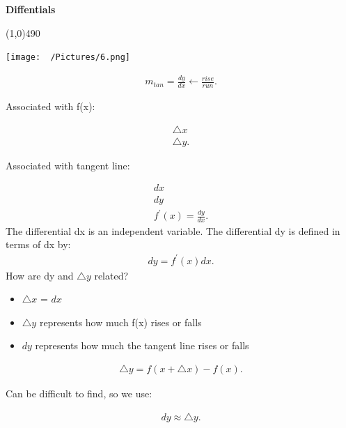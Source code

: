 \documentclass{report}
\begin{document}
    \pagebreak \bigbreak \noindent
    \begin{mdframed}
    \begin{large}
        \begin{center}
            \textbf{Diffentials}
        \end{center}
    \end{large}
    \end{mdframed}
    \line(1,0){490}
    \bigbreak \noindent \bigbreak
    \begin{center}
      \texttt{[image: ~/Pictures/6.png]}
    \end{center}
    \begin{align*}
      m_{tan} = \frac{dy}{dx} \leftarrow \frac{rise}{run}
    .\end{align*}
    \bigbreak \noindent 
    \begin{center}
      Associated with f(x):
    \end{center}
    \begin{align*}
      \triangle x \\
      \triangle y
    .\end{align*}
    \bigbreak \noindent 
    \begin{center}
      Associated with tangent line:
    \end{center}
    \begin{align*}
      dx \\
      dy \\
      f^{\prime}(x) = \frac{dy}{dx}
    .\end{align*}
    \bigbreak \noindent 
    The differential dx is an independent variable.
    \smallbreak \noindent
    The differential dy is defined in terms of dx by:
    \begin{align*}
      \boxed{dy = f^{\prime}(x)dx}
    .\end{align*}
    \bigbreak \noindent 
    How are dy and $\triangle y$ related?
    \begin{itemize}
      \item $\triangle x$ = $dx$
      \item $\triangle y$ represents how much f(x) rises or falls
      \item $dy$ represents how much the tangent line rises or falls
    \end{itemize}
    \begin{align*}
      \boxed{\triangle y  = f(x + \triangle x) -f(x)}
    .\end{align*}
    \begin{center}
      Can be difficult to find, so we use:
    \end{center}
    \begin{align*}
      dy \approx \triangle y
    .\end{align*}
\end{document}

